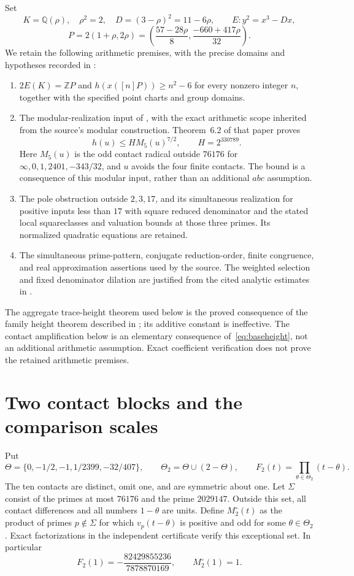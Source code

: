 \documentclass[11pt,a4paper]{article}
\newcommand{\Q}{\mathbb Q}\newcommand{\Z}{\mathbb Z}\newcommand{\HH}{\mathcal H}
\begin{document}
Set
\[
 K=\Q(\rho),\quad \rho^2=2,\quad D=(3-\rho)^2=11-6\rho,
 \qquad E:y^2=x^3-Dx,
\]
\[
 P=2(1+\rho,2\rho)
 =\left(\frac{57-28\rho}{8},\frac{-660+417\rho}{32}\right).
\]
We retain the following arithmetic premises, with the precise domains
and hypotheses recorded in \cite{Dependencies,Source,Weights}:
\begin{enumerate}
\item $2E(K)=\Z P$ and $h(x([n]P))\ge n^2-6$ for every nonzero
integer $n$, together with the specified point charts and group domains.
\item The modular-realization input of
\cite[Definition~6.1]{NewHeight}, with the exact arithmetic scope inherited
from the source's modular construction. Theorem~6.2 of that paper proves
\begin{equation}\label{eq:baseheight}
 h(u)\le H M_5(u)^{7/2},\qquad H=2^{330789}.
\end{equation}
Here $M_5(u)$ is the odd contact radical outside $76176$ for
$\infty,0,1,2401,-343/32$, and $u$ avoids the four finite contacts.
The bound is a consequence of this modular input, rather than an
additional $abc$ assumption.
\item The pole obstruction outside $2,3,17$, and its simultaneous
realization for positive inputs less than $17$ with square reduced
denominator and the stated local squareclasses and valuation bounds
at those three primes. Its normalized quadratic equations are retained.
\item The simultaneous prime-pattern, conjugate reduction-order,
finite congruence, and real approximation assertions used by the source.
The weighted selection and fixed denominator dilation are justified
from the cited analytic estimates in \cite{Selection}.
\end{enumerate}
The aggregate trace-height theorem used below is the proved consequence
of the family height theorem described in \cite{Aggregate}; its additive
constant is ineffective. The contact amplification below is an elementary consequence of~\eqref{eq:baseheight},
not an additional arithmetic assumption. Exact coefficient verification
does not prove the retained arithmetic premises.

\section{Two contact blocks and the comparison scales}
Put
\[
 \Theta=\{0,-1/2,-1,1/2399,-32/407\},\qquad
 \Theta_2=\Theta\cup(2-\Theta),\qquad
 F_2(t)=\prod_{\theta\in\Theta_2}(t-\theta).
\]
The ten contacts are distinct, omit one, and are symmetric about one.
Let $\Sigma$ consist of the primes at most $76176$ and the prime
$2029147$. Outside this set, all contact differences and all numbers
$1-\theta$ are units. Define $M_2^\circ(t)$ as the product of primes
$p\notin\Sigma$ for which $v_p(t-\theta)$ is positive and odd for
some $\theta\in\Theta_2$. Exact factorizations in the independent
certificate verify this exceptional set. In particular
\[
 F_2(1)=-\frac{82429855236}{7878870169},\qquad M_2^\circ(1)=1.
\]
\end{document}
